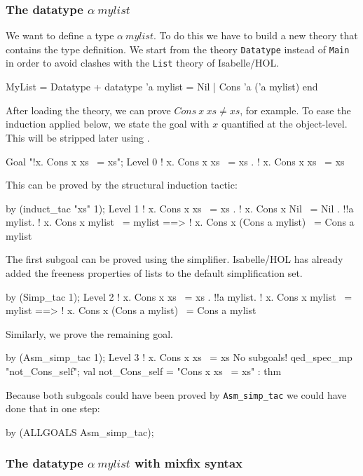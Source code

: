 \subsubsection{The datatype $\alpha~mylist$}

We want to define a type $\alpha~mylist$. To do this we have to build a new
theory that contains the type definition.  We start from the theory
\texttt{Datatype} instead of \texttt{Main} in order to avoid clashes with the
\texttt{List} theory of Isabelle/HOL.
\begin{ttbox}
MyList = Datatype +
  datatype 'a mylist = Nil | Cons 'a ('a mylist)
end
\end{ttbox}
After loading the theory, we can prove $Cons~x~xs\neq xs$, for example.  To
ease the induction applied below, we state the goal with $x$ quantified at the
object-level.  This will be stripped later using .
\begin{ttbox}
Goal "!x. Cons x xs ~= xs";
{\out Level 0}
{\out ! x. Cons x xs ~= xs}
{. ! x. Cons x xs ~= xs}
\end{ttbox}
This can be proved by the structural induction tactic:
\begin{ttbox}
by (induct_tac "xs" 1);
{\out Level 1}
{\out ! x. Cons x xs ~= xs}
{. ! x. Cons x Nil ~= Nil}
{. !!a mylist.}
{\out        ! x. Cons x mylist ~= mylist ==>}
{\out        ! x. Cons x (Cons a mylist) ~= Cons a mylist}
\end{ttbox}
The first subgoal can be proved using the simplifier.  Isabelle/HOL has
already added the freeness properties of lists to the default simplification
set.
\begin{ttbox}
by (Simp_tac 1);
{\out Level 2}
{\out ! x. Cons x xs ~= xs}
{. !!a mylist.}
{\out        ! x. Cons x mylist ~= mylist ==>}
{\out        ! x. Cons x (Cons a mylist) ~= Cons a mylist}
\end{ttbox}
Similarly, we prove the remaining goal.
\begin{ttbox}
by (Asm_simp_tac 1);
{\out Level 3}
{\out ! x. Cons x xs ~= xs}
{\out No subgoals!}
\ttbreak
qed_spec_mp "not_Cons_self";
{\out val not_Cons_self = "Cons x xs ~= xs" : thm}
\end{ttbox}
Because both subgoals could have been proved by \texttt{Asm_simp_tac}
we could have done that in one step:
\begin{ttbox}
by (ALLGOALS Asm_simp_tac);
\end{ttbox}


\subsubsection{The datatype $\alpha~mylist$ with mixfix syntax}

